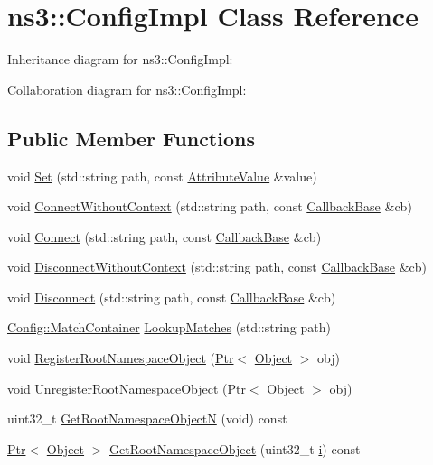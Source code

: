 \hypertarget{classns3_1_1ConfigImpl}{}\section{ns3\+:\+:Config\+Impl Class Reference}
\label{classns3_1_1ConfigImpl}


Inheritance diagram for ns3\+:\+:Config\+Impl\+:


Collaboration diagram for ns3\+:\+:Config\+Impl\+:
\subsection*{Public Member Functions}
\begin{DoxyCompactItemize}
\item 
void \hyperlink{classns3_1_1ConfigImpl_ae9a4dc1fdb7e45839c1e129298f54542}{Set} (std\+::string path, const \hyperlink{classns3_1_1AttributeValue}{Attribute\+Value} \&value)
\item 
void \hyperlink{classns3_1_1ConfigImpl_aa0db4dcd16fd336f39054a21634f6989}{Connect\+Without\+Context} (std\+::string path, const \hyperlink{classns3_1_1CallbackBase}{Callback\+Base} \&cb)
\item 
void \hyperlink{classns3_1_1ConfigImpl_a9e74a4715051a976d08d83447b2a0094}{Connect} (std\+::string path, const \hyperlink{classns3_1_1CallbackBase}{Callback\+Base} \&cb)
\item 
void \hyperlink{classns3_1_1ConfigImpl_a74e45b498dd76709fd669a862b16d760}{Disconnect\+Without\+Context} (std\+::string path, const \hyperlink{classns3_1_1CallbackBase}{Callback\+Base} \&cb)
\item 
void \hyperlink{classns3_1_1ConfigImpl_adda3f0ff44215a70d1d2f0fdd6519d9d}{Disconnect} (std\+::string path, const \hyperlink{classns3_1_1CallbackBase}{Callback\+Base} \&cb)
\item 
\hyperlink{classns3_1_1Config_1_1MatchContainer}{Config\+::\+Match\+Container} \hyperlink{classns3_1_1ConfigImpl_a15729299768695aa09a7ac0ba2c3b7e9}{Lookup\+Matches} (std\+::string path)
\item 
void \hyperlink{classns3_1_1ConfigImpl_a09ad253d834e9c8a6fd806bec303c29c}{Register\+Root\+Namespace\+Object} (\hyperlink{classns3_1_1Ptr}{Ptr}$<$ \hyperlink{classns3_1_1Object}{Object} $>$ obj)
\item 
void \hyperlink{classns3_1_1ConfigImpl_a902f64f3a7f362e53273d2e18d1d3d9f}{Unregister\+Root\+Namespace\+Object} (\hyperlink{classns3_1_1Ptr}{Ptr}$<$ \hyperlink{classns3_1_1Object}{Object} $>$ obj)
\item 
uint32\+\_\+t \hyperlink{classns3_1_1ConfigImpl_a71961c0e9c32b38b00ea7bf049a5a184}{Get\+Root\+Namespace\+ObjectN} (void) const 
\item 
\hyperlink{classns3_1_1Ptr}{Ptr}$<$ \hyperlink{classns3_1_1Object}{Object} $>$ \hyperlink{classns3_1_1ConfigImpl_af6106c2929095bb03cfc55ccdabc0075}{Get\+Root\+Namespace\+Object} (uint32\+\_\+t \hyperlink{lte__uplink__power__control_8m_a6f6ccfcf58b31cb6412107d9d5281426}{i}) const 
\end{DoxyCompactItemize}
